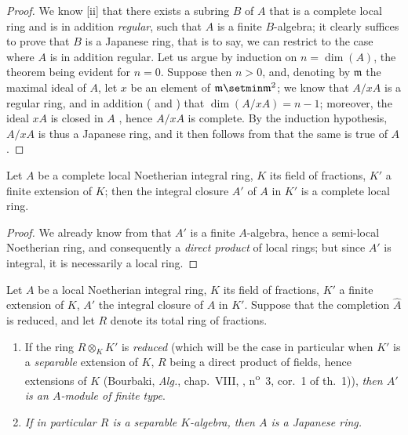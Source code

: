 \begin{proof}
We know [ii] that there exists a subring $B$ of $A$ that is a complete local
ring and is in addition \emph{regular}, such that $A$ is a finite $B$-algebra; it clearly suffices to prove that $B$ is a Japanese ring, that is to say, we can restrict to the case where $A$ is in addition regular.
Let us argue by induction on $n=\dim(A)$, the theorem being evident for $n=0$.
Suppose then $n>0$, and, denoting by $\mathfrak{m}$ the maximal ideal of $A$, let $x$ be an element of $\mathfrak{m}\setmin\mathfrak{m}^2$; we know  that $A/xA$ is a regular ring, and in addition ( and ) that $\dim(A/xA)=n-1$; moreover, the ideal $xA$ is closed in $A$ , hence $A/xA$ is complete.
By the induction hypothesis, $A/xA$ is thus a Japanese ring, and it then follows from  that the same is true of $A$.
\end{proof}

\begin{corollary}[23.1.6]
\label{0.23.1.6}
Let $A$ be a complete local Noetherian integral ring, $K$ its field of fractions, $K'$ a finite extension of $K$; then the integral closure $A'$ of $A$ in $K'$ is a complete local ring.
\end{corollary}

\begin{proof}
We already know from  that $A'$ is a finite $A$-algebra, hence a semi-local Noetherian ring, and consequently a \emph{direct product} of local rings; but since $A'$ is integral, it is necessarily a local ring.
\end{proof}

\begin{proposition}[23.1.7]
\label{0.23.1.7}
Let $A$ be a local Noetherian integral ring, $K$ its field of fractions, $K'$ a finite extension of $K$, $A'$ the integral closure of $A$ in $K'$.
Suppose that the completion $\hat{A}$ is reduced, and let $R$ denote its total ring of fractions.
\begin{enumerate}
  \item[{\rm(i)}] If the ring $R\otimes_K K'$ is \emph{reduced} (which will be the case in particular when $K'$ is a \emph{separable} extension of $K$, $R$ being a direct product of fields, hence extensions of $K$ \textnormal{(Bourbaki, \emph{Alg.}, chap.~VIII, , n\textsuperscript{o}~3, cor.~1 of th.~1)}), \emph{then $A'$ is an $A$-module of finite type}.
  \item[{\rm(ii)}] \emph{If in particular $R$ is a separable $K$-algebra, then $A$ is a Japanese ring.}
\end{enumerate}
\end{proposition}

